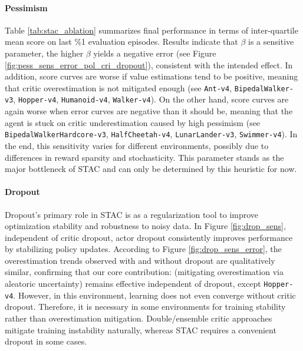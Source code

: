 \documentclass{article}
\begin{document}
\paragraph{Pessimism} Table \ref{tab:stac_ablation} summarizes final performance in terms of inter-quartile mean score on last \%1 evaluation episodes. Results indicate that $\beta$ is a sensitive parameter, the higher $\beta$ yields a negative error (see Figure \ref{fig:pess_sens_error_pol_cri_dropout}), consistent with the intended effect. In addition, score curves are worse if value estimations tend to be positive, meaning that critic overestimation is not mitigated enough (see \verb|Ant-v4|, \verb|BipedalWalker-v3|, \verb|Hopper-v4|, \verb|Humanoid-v4|, \verb|Walker-v4|). On the other hand, score curves are again worse when error curves are negative than it should be, meaning that the agent is stuck on critic underestimation caused by high pessimism (see \verb|BipedalWalkerHardcore-v3|, \verb|HalfCheetah-v4|, \verb|LunarLander-v3|, \verb|Swimmer-v4|). In the end, this sensitivity varies for different environments, possibly due to differences in reward sparsity and stochasticity. This parameter stands as the major bottleneck of STAC and can only be determined by this heuristic for now. %

\paragraph{Dropout}
Dropout's primary role in STAC is as a regularization tool to improve optimization stability and robustness to noisy data. In Figure \ref{fig:drop_sens}, independent of critic dropout, actor dropout consistently improves performance by stabilizing policy updates. According to Figure \ref{fig:drop_sens_error}, the overestimation trends observed with and without dropout are qualitatively similar, confirming that our core contribution: (mitigating overestimation via aleatoric uncertainty) remains effective independent of dropout, except \verb|Hopper-v4|. However, in this environment, learning does not even converge without critic dropout. Therefore, it is necessary in some environments for training stability rather than overestimation mitigation. Double/ensemble critic approaches mitigate training instability naturally, whereas STAC requires a convenient dropout in some cases. 
\end{document}
